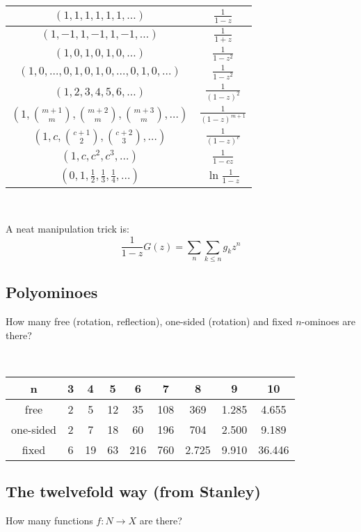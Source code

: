 \begin{tabular}{|c|c|}
    \hline
    $(1,1,1,1,1,1,\ldots)$ & $\frac{1}{1-z}$ \\ \hline
    $(1,-1,1,-1,1,-1,\ldots)$ & $\frac{1}{1+z}$ \\ \hline
    $(1,0,1,0,1,0,\ldots)$ & $\frac{1}{1-z^2}$ \\ \hline
    $(1,0,\ldots,0,1,0,1,0,\ldots,0,1,0,\ldots)$ & $\frac{1}{1-z^2}$ \\ \hline
    $(1,2,3,4,5,6,\ldots)$ & $\frac{1}{(1-z)^2}$ \\ \hline
    $(1,\binom{m+1}{m},\binom{m+2}{m},\binom{m+3}{m},\ldots)$ & $\frac{1}{(1-z)^{m+1}}$ \\ \hline
    $(1,c,\binom{c+1}{2},\binom{c+2}{3},\ldots)$ & $\frac{1}{(1-z)^c}$ \\ \hline
    $(1,c,c^2, c^3, \ldots)$ & $\frac{1}{1-cz}$ \\ \hline
    $(0,1,\frac{1}{2},\frac{1}{3},\frac{1}{4},\ldots)$ & $\ln \frac{1}{1-z}$ \\ \hline
\end{tabular}

\

A neat manipulation trick is:
\begin{equation*}
    \frac{1}{1-z}G(z) = \sum_{n}\sum_{k\leq n}g_kz^n
\end{equation*}

\subsection{Polyominoes} How many free (rotation, reflection), one-sided (rotation) and fixed $n$-ominoes are there?

\

\begin{tabular}{|c|c|c|c|c|c|c|c|c|}
    \hline
    n&3&4&5&6&7&8&9&10 \\ \hline
    free&2&5&12&35&108&369&1.285&4.655 \\ \hline
    one-sided&2&7&18&60&196&704&2.500&9.189 \\ \hline
    fixed&6&19&63&216&760&2.725&9.910&36.446 \\ \hline
\end{tabular}

\subsection{The twelvefold way (from Stanley)} How many functions $f \colon N \rightarrow X$ are there?

